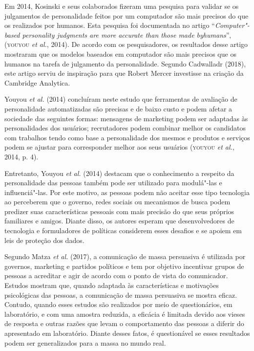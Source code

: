 Em 2014, Kosinski e seus colaborados fizeram uma pesquisa para validar
se os julgamentos de personalidade feitos por um computador são mais
precisos do que os realizados por humanos. Esta pesquisa foi documentada
no artigo ``\emph{Computer"-based personality judgments are more accurate
than those made byhumans}'', (\textsc{youyou} \emph{et al.}, 2014). De acordo com os
pesquisadores, os resultados desse artigo mostraram que os modelos
baseados em computador são mais precisos que os humanos na tarefa de
julgamento da personalidade. Segundo Cadwalladr (2018), este artigo
serviu de inspiração para que Robert Mercer investisse na criação da
Cambridge Analytica.

Youyou \emph{et al.} (2014) concluíram neste estudo que ferramentas de avaliação
de personalidade automatizadas são precisas e de baixo custo e podem
afetar a sociedade das seguintes formas: mensagens de marketing podem
ser adaptadas às personalidades dos usuários; recrutadores podem
combinar melhor os candidatos com trabalhos tendo como base a
personalidade dos mesmos e produtos e serviços podem se ajustar para
corresponder melhor aos seus usuários (\textsc{youyou} \emph{et al.}, 2014, p. 4).

Entretanto, Youyou \emph{et al.} (2014) destacam que o conhecimento a respeito
da personalidade das pessoas também pode ser utilizado para modulá"-las e
influenciá"-las. Por este motivo, as pessoas podem não aceitar esse tipo
tecnologia ao perceberem que o governo, redes sociais ou mecanismos de
busca podem predizer suas características pessoais com mais precisão do
que seus próprios familiares e amigos. Diante disso, os autores esperam
que desenvolvedores de tecnologia e formuladores de políticas considerem
esses desafios e se apoiem em leis de proteção dos dados.

Segundo Matza \emph{et al.} (2017), a comunicação de massa persuasiva é
utilizada por governos, marketing e partidos políticos e tem por
objetivo incentivar grupos de pessoas a acreditar e agir de acordo com o
ponto de vista do comunicador. Estudos mostram que, quando adaptada às
características e motivações psicológicas das pessoas, a comunicação de
massa persuasiva se mostra eficaz. Contudo, quando esses estudos são
realizados por meio de questionários, em laboratório, e com uma amostra
reduzida, a eficácia é limitada devido aos vieses de resposta e outras
razões que levam o comportamento das pessoas a diferir do apresentado em
laboratório. Diante desses fatos, é questionável se esses resultados
podem ser generalizados para a massa no mundo real.

